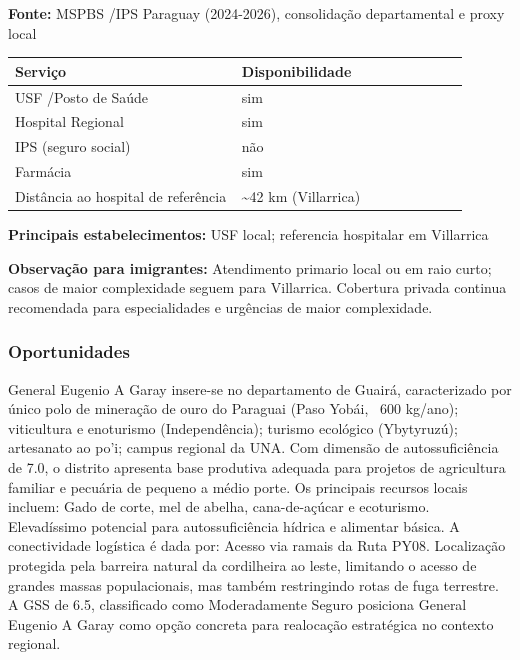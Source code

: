 \textbf{Fonte:} MSPBS /\allowbreak  IPS Paraguay (2024-2026), consolidação
departamental e proxy local

{\def\LTcaptype{none} %
\begin{longtable}{@{}>{\raggedright\arraybackslash}p{0.45\linewidth} >{\raggedright\arraybackslash}p{0.45\linewidth}@{}}
\toprule\noalign{}
Serviço & Disponibilidade \\
\midrule\noalign{}
\endhead
\bottomrule\noalign{}
\endlastfoot
USF /\allowbreak  Posto de Saúde & sim \\
Hospital Regional & sim \\
IPS (seguro social) & não \\
Farmácia & sim \\
Distância ao hospital de referência & \textasciitilde42 km
(Villarrica) \\
\end{longtable}
}

\textbf{Principais estabelecimentos:} USF local; referencia hospitalar
em Villarrica

\textbf{Observação para imigrantes:} Atendimento primario local ou em
raio curto; casos de maior complexidade seguem para Villarrica.
Cobertura privada continua recomendada para especialidades e urgências
de maior complexidade.
\newpage

\subsubsection*{Oportunidades}\label{oport-general-eugenio-a-garay-0404}
General Eugenio A Garay insere-se no departamento de Guairá, caracterizado por único polo de mineração de ouro do Paraguai (Paso Yobái, ~600 kg/ano); viticultura e enoturismo (Independência); turismo ecológico (Ybytyruzú); artesanato ao po'i; campus regional da UNA. Com dimensão de autossuficiência de 7.0, o distrito apresenta base produtiva adequada para projetos de agricultura familiar e pecuária de pequeno a médio porte. Os principais recursos locais incluem: Gado de corte, mel de abelha, cana-de-açúcar e ecoturismo. Elevadíssimo potencial para autossuficiência hídrica e alimentar básica. A conectividade logística é dada por: Acesso via ramais da Ruta PY08. Localização protegida pela barreira natural da cordilheira ao leste, limitando o acesso de grandes massas populacionais, mas também restringindo rotas de fuga terrestre. A GSS de 6.5, classificado como Moderadamente Seguro posiciona General Eugenio A Garay como opção concreta para realocação estratégica no contexto regional.

